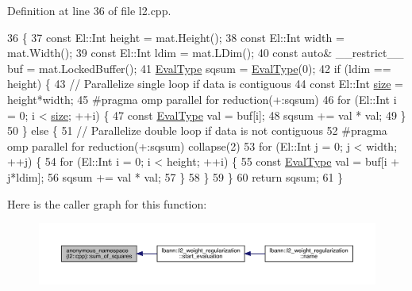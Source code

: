 Definition at line 36 of file l2.\+cpp.


\begin{DoxyCode}
36                                           \{
37     \textcolor{keyword}{const} El::Int height = mat.Height();
38     \textcolor{keyword}{const} El::Int width = mat.Width();
39     \textcolor{keyword}{const} El::Int ldim = mat.LDim();
40     \textcolor{keyword}{const} \textcolor{keyword}{auto}& \_\_restrict\_\_ buf = mat.LockedBuffer();
41     \hyperlink{base_8hpp_a3266f5ac18504bbadea983c109566867}{EvalType} sqsum = \hyperlink{base_8hpp_a3266f5ac18504bbadea983c109566867}{EvalType}(0);
42     \textcolor{keywordflow}{if} (ldim == height) \{
43       \textcolor{comment}{// Parallelize single loop if data is contiguous}
44       \textcolor{keyword}{const} El::Int \hyperlink{structc__hash__table_afd5bfd9640fc5b72f75457fb7dd89663}{size} = height*width;
45 \textcolor{preprocessor}{      #pragma omp parallel for reduction(+:sqsum)}
46       \textcolor{keywordflow}{for} (El::Int i = 0; i < \hyperlink{structc__hash__table_afd5bfd9640fc5b72f75457fb7dd89663}{size}; ++i) \{
47         \textcolor{keyword}{const} \hyperlink{base_8hpp_a3266f5ac18504bbadea983c109566867}{EvalType} val = buf[i];
48         sqsum += val * val;
49       \}
50     \} \textcolor{keywordflow}{else} \{
51       \textcolor{comment}{// Parallelize double loop if data is not contiguous}
52 \textcolor{preprocessor}{      #pragma omp parallel for reduction(+:sqsum) collapse(2)}
53       \textcolor{keywordflow}{for} (El::Int j = 0; j < width; ++j) \{
54         \textcolor{keywordflow}{for} (El::Int i = 0; i < height; ++i) \{
55           \textcolor{keyword}{const} \hyperlink{base_8hpp_a3266f5ac18504bbadea983c109566867}{EvalType} val = buf[i + j*ldim];
56           sqsum += val * val;
57         \}
58       \}
59     \}
60     \textcolor{keywordflow}{return} sqsum;
61   \}
\end{DoxyCode}
Here is the caller graph for this function\+:\nopagebreak
\begin{figure}[H]
\begin{center}
\leavevmode
\includegraphics[width=350pt]{namespaceanonymous__namespace_02l2_8cpp_03_a32724e48048319cd99337131ba70d4c4_icgraph}
\end{center}
\end{figure}

